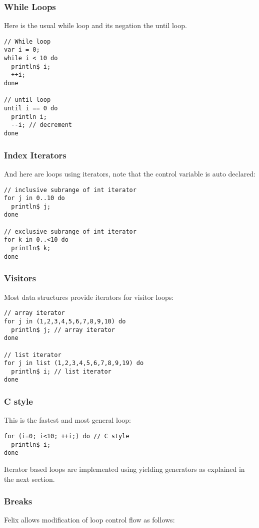 \documentclass[oneside]{book}
\begin{document}
\subsubsection{While Loops}
Here is the usual while loop and its negation the until loop.

\begin{verbatim}
// While loop
var i = 0;
while i < 10 do
  println$ i;
  ++i; 
done

// until loop
until i == 0 do 
  println i;
  --i; // decrement
done
\end{verbatim}

\subsubsection{Index Iterators}
And here are loops using iterators, note that the
control variable is auto declared:

\begin{verbatim}
// inclusive subrange of int iterator
for j in 0..10 do 
  println$ j; 
done

// exclusive subrange of int iterator
for k in 0..<10 do 
  println$ k;
done
\end{verbatim}

\subsubsection{Visitors}
Most data structures provide iterators for
visitor loops:

\begin{verbatim}
// array iterator
for j in (1,2,3,4,5,6,7,8,9,10) do
  println$ j; // array iterator
done

// list iterator
for j in list (1,2,3,4,5,6,7,8,9,19) do
  println$ i; // list iterator
done
\end{verbatim}

\subsubsection{C style}
This is the fastest and most general loop:

\begin{verbatim}
for (i=0; i<10; ++i;) do // C style
  println$ i;
done
\end{verbatim}

Iterator based loops are implemented using yielding generators
as explained in the next section.

\subsubsection{Breaks}
Felix allows modification of loop control flow as follows:
\end{document}
